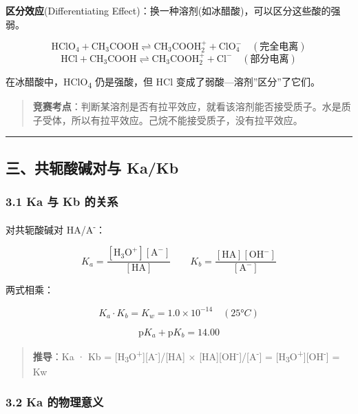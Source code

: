\documentclass[a4paper,11pt]{ctexart}
\newcommand{\箭}{\ensuremath{\rightarrow}}
\newcommand{\左箭}{\ensuremath{\leftarrow}}
\newcommand{\上箭}{\ensuremath{\uparrow}}
\newcommand{\下箭}{\ensuremath{\downarrow}}
\newcommand{\衡}{\ensuremath{\rightleftharpoons}}
\newcommand{\双箭}{\ensuremath{\leftrightarrow}}
\newcommand{\约等于}{\ensuremath{\approx}}
\newcommand{\小于等于}{\ensuremath{\leq}}
\newcommand{\大于等于}{\ensuremath{\geq}}
\newcommand{\不等于}{\ensuremath{\neq}}
\newcommand{\西格马}{\ensuremath{\sigma}}
\newcommand{\派}{\ensuremath{\pi}}
\begin{document}
\textbf{区分效应}(Differentiating Effect)：换一种溶剂(如冰醋酸)，可以区分这些酸的强弱。

\[
\mathrm{HClO_4 + CH_3COOH \rightleftharpoons CH_3COOH_2^+ + ClO_4^-} \quad (\text{完全电离})
\]
\[
\mathrm{HCl + CH_3COOH \rightleftharpoons CH_3COOH_2^+ + Cl^-} \quad (\text{部分电离})
\]

在冰醋酸中，HClO\textsubscript{4} 仍是强酸，但 HCl 变成了弱酸---溶剂''区分''了它们。

\begin{quote}
\textbf{竞赛考点}：判断某溶剂是否有拉平效应，就看该溶剂能否接受质子。水是质子受体，所以有拉平效应。己烷不能接受质子，没有拉平效应。
\end{quote}

\begin{center}\rule{0.5\linewidth}{0.5pt}\end{center}

\subsection{三、共轭酸碱对与 Ka/Kb}\label{ux4e09ux5171ux8f6dux9178ux78b1ux5bf9ux4e0e-kakb}

\subsubsection{3.1 Ka 与 Kb 的关系}\label{ka-ux4e0e-kb-ux7684ux5173ux7cfb}

对共轭酸碱对 HA/A\textsuperscript{-}：

\[
K_a = \frac{[\mathrm{H_3O^+}][\mathrm{A^-}]}{[\mathrm{HA}]} \qquad K_b = \frac{[\mathrm{HA}][\mathrm{OH^-}]}{[\mathrm{A^-}]}
\]

两式相乘：

\[
\boxed{K_a \cdot K_b = K_w = 1.0 \times 10^{-14} \quad (25°C)}
\]

\[
\boxed{\mathrm{p}K_a + \mathrm{p}K_b = 14.00}
\]

\begin{quote}
\textbf{推导}：Ka · Kb = {[}H\textsubscript{3}O\textsuperscript{+}{]}{[}A\textsuperscript{-}{]}/{[}HA{]} × {[}HA{]}{[}OH\textsuperscript{-}{]}/{[}A\textsuperscript{-}{]} = {[}H\textsubscript{3}O\textsuperscript{+}{]}{[}OH\textsuperscript{-}{]} = Kw
\end{quote}

\subsubsection{3.2 Ka 的物理意义}\label{ka-ux7684ux7269ux7406ux610fux4e49}
\end{document}

